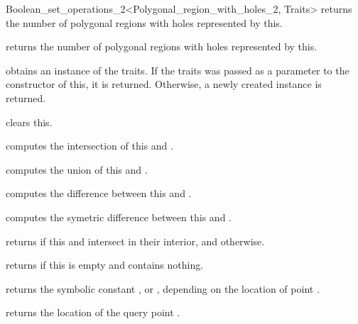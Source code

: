 \begin{ccRefClass}{Boolean_set_operations_2<Polygonal_region_with_holes_2, Traits>}
  {returns the number of polygonal regions with holes represented by
  this.}

  {returns the number of polygonal regions with holes represented by
  this.}

  {obtains an instance of the traits. If the traits was passed as a
  parameter to the constructor of this, it is returned. Otherwise, a
  newly created instance is returned.}

\ccModifiers
  {clears this.}

  {computes the intersection of this and .}

  {computes the union of this and .}

  {computes the difference between this and .}

  {computes the symetric difference between this and .}
  
\ccPredicates
  {returns  if this and  intersect in their
  interior, and  otherwise.}

  {returns  if this is empty and contains nothing.}

  {returns the symbolic constant ,
   or , depending on the
  location of point .}

  {returns the location of the query point .}

\ccSeeAlso
  \\

\end{ccRefClass}

\ccRefPageEnd
